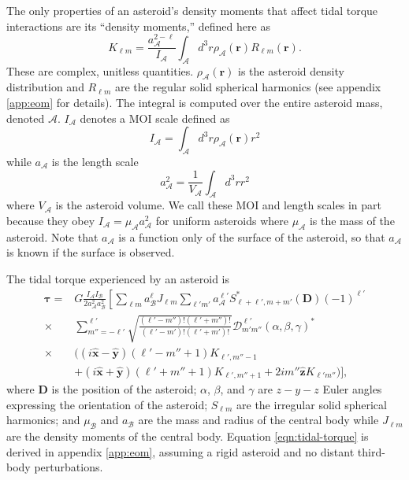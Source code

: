 \documentclass[fleqn,usenatbib]{mnras}
\newcommand{\unit}[1]{\bm{\hat{#1}}}
\begin{document}
The only properties of an asteroid's density moments that affect tidal torque interactions are its ``density moments,'' defined here as
\begin{equation}
  K_{\ell m} = \frac{a_\mathcal{A}^{2-\ell}}{I_\mathcal{A}} \int_\mathcal{A} d^3 r \rho_\mathcal{A}(\bm r) R_{\ell m}(\bm r).
  \label{eqn:klm}
\end{equation}
These are complex, unitless quantities. $\rho_\mathcal{A}(\bm r)$ is the asteroid density distribution and $R_{\ell m}$ are the regular solid spherical harmonics (see appendix \ref{app:eom} for details). The integral is computed over the entire asteroid mass, denoted $\mathcal{A}$. $I_\mathcal{A}$ denotes a MOI scale defined as 
\begin{equation}
  I_\mathcal{A} = \int_\mathcal{A} d^3 r \rho_\mathcal{A}(\bm r) r^2
  \label{eqn:ia}
\end{equation}
while $a_\mathcal{A}$ is the length scale
\begin{equation}
  a_\mathcal{A}^2 = \frac{1}{V_\mathcal{A}} \int_\mathcal{A} d^3 r r^2
  \label{eqn:aa}
\end{equation}
where $V_\mathcal{A}$ is the asteroid volume. We call these MOI and length scales in part because they obey $I_\mathcal{A} = \mu_\mathcal{A} a_\mathcal{A}^2$ for uniform asteroids where $\mu_\mathcal{A}$ is the mass of the asteroid. Note that $a_\mathcal{A}$ is a function only of the surface of the asteroid, so that $a_\mathcal{A}$ is known if the surface is observed.

The tidal torque experienced by an asteroid is 
\begin{equation}
  \begin{split}
  \bm \tau = & G\frac{I_\mathcal{A}I_\mathcal{B}}{2 a_\mathcal{A}^2a_\mathcal{B}^2}\left[\sum_{\ell m} a_\mathcal{B}^\ell J_{\ell m} \sum_{\ell' m'}a_\mathcal{A}^{\ell'}S^*_{\ell+\ell', m + m'} (\bm D) (-1)^{\ell'}\right.\\
  \times & \left.\sum_{m''=-\ell'}^{\ell'} \sqrt{\frac{(\ell'-m'')!(\ell'+m'')!}{(\ell'-m')!(\ell'+m')!}}  \mathcal{D}^{\ell'}_{m'm''}(\alpha, \beta, \gamma)^* \right. \\
  \times & \Big((i\unit x - \unit y)(\ell'-m''+1)K_{\ell',m''-1} \\
  & +(i\unit x+\unit y)(\ell'+m''+1)K_{\ell',m''+1}+2im''\unit z K_{\ell'm''}\Big) \Bigg],
  \end{split}
  \label{eqn:tidal-torque}
\end{equation}
where $\bm D$ is the position of the asteroid; $\alpha$, $\beta$, and $\gamma$ are $z-y-z$ Euler angles expressing the orientation of the asteroid; $S_{\ell m}$ are the irregular solid spherical harmonics; and $\mu_\mathcal{B}$ and $a_\mathcal{B}$ are the mass and radius of the central body while $J_{\ell m}$ are the density moments of the central body. Equation \ref{eqn:tidal-torque} is derived in appendix \ref{app:eom}, assuming a rigid asteroid and no distant third-body perturbations. 
\end{document}
